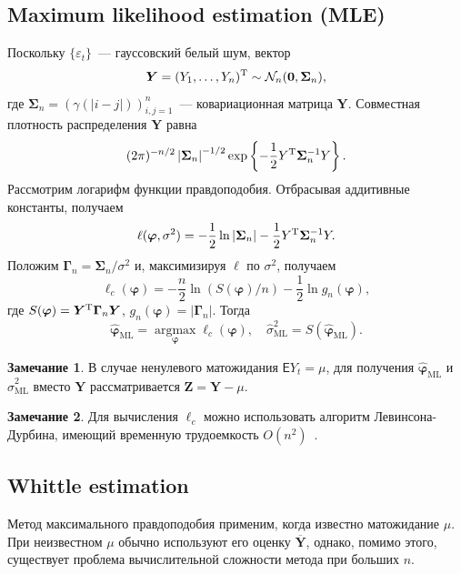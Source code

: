 \documentclass[specialist,
substylefile = spbu_report.rtx,
subf,href,colorlinks=true, 12pt]{disser}
\theoremstyle{definition}
\newtheorem{remark}{Замечание}[chapter]
\begin{document}
\subsection{Maximum likelihood estimation (MLE)}
Поскольку $\{\varepsilon_t\}$~--- гауссовский белый шум, вектор
\[
	\bm Y=(Y_1,\ldots,Y_n)^{\mathrm{T}}\sim \mathcal{N}_n(\bm0, \bm\Sigma_n),
\]
где $\bm\Sigma_n=(\gamma(|i-j|))_{i,j=1}^n$~--- ковариационная матрица $\bm Y$. Совместная плотность распределения $\bm Y$ равна
\[
	(2\pi)^{-n/2}\left|\bm\Sigma_n\right|^{-1/2}\exp\left\{-\frac12Y^{\mathrm{T}}\bm\Sigma_n^{-1}Y\right\}.
\]
Рассмотрим логарифм функции правдоподобия. Отбрасывая аддитивные константы, получаем
\[
	\ell(\bm\varphi, \sigma^2)=-\frac12\ln\left|\bm\Sigma_n\right|-\frac12 Y^{\mathrm{T}} \bm\Sigma_n^{-1} Y.
\]
Положим $\bm\Gamma_n=\bm\Sigma_n / \sigma^2$ и, максимизируя $\ell$ по $\sigma^2$, получаем
\begin{equation}\label{eq:mle_objective}
	\ell_c(\bm\varphi)=-\frac{n}{2}\ln\left(S(\bm\varphi) / n\right) - \frac{1}{2}\ln g_n(\bm\varphi),
\end{equation}
где $S(\bm\varphi)=\bm Y^{\mathrm{T}} \bm\Gamma_n\bm Y$, $g_n(\bm\varphi)=\left|\bm\Gamma_n\right|$.
Тогда
\[
	\widehat{\bm\varphi}_\mathrm{ML}=\operatorname*{argmax}\limits_{\bm\varphi}\ell_c(\bm\varphi),\quad \widehat\sigma^2_\mathrm{ML} = S(\widehat{\bm\varphi}_\mathrm{ML}).
\]

\begin{remark}
	В случае ненулевого матожидания $\mathsf{E}Y_t=\mu$, для получения $\widehat{\bm\varphi}_\mathrm{ML}$ и $\widehat\sigma^2_\mathrm{ML}$ вместо $\bm Y$ рассматривается $\bm Z=\bm Y-\mu$.
\end{remark}
\begin{remark}
	Для вычисления $\ell_c$ можно использовать алгоритм Левинсона-Дурбина, имеющий временную трудоемкость $O(n^2)$~\cite{McLeod2007}.
\end{remark}
\subsection{Whittle estimation}
Метод максимального правдоподобия применим, когда известно матожидание $\mu$. При неизвестном $\mu$ обычно используют его оценку $\overline{\bm Y}$, однако, помимо этого, существует проблема вычислительной сложности метода при больших $n$.
\end{document}
